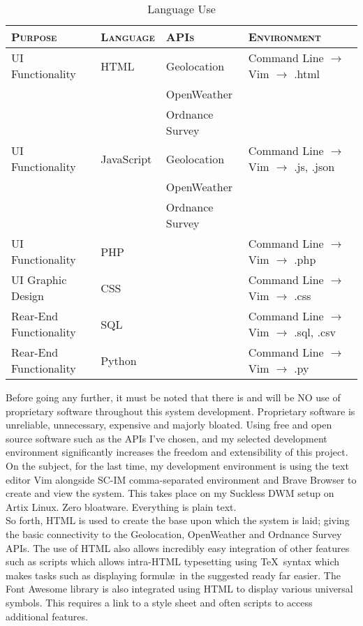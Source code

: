 \documentclass[11pt, english]{article}
\begin{document}
	\begin{table}[h]
		\scriptsize
		\renewcommand{\arraystretch}{1.25}
	\begin{center}
	\begin{tabular}{llll}
		\textsc{Purpose} & \textsc{Language} & \textsc{APIs} & \textsc{Environment}\\
		\hline
		UI Functionality & HTML & Geolocation & Command Line $\rightarrow$ Vim $\rightarrow$ .html\\
		& & OpenWeather\\
		& & Ordnance Survey\\
		UI Functionality & JavaScript & Geolocation & Command Line $\rightarrow$ Vim $\rightarrow$ .js, .json\\
		& & OpenWeather\\
		& & Ordnance Survey\\
		UI Functionality & PHP & & Command Line $\rightarrow$ Vim $\rightarrow$ .php\\
		UI Graphic Design & CSS & & Command Line $\rightarrow$ Vim $\rightarrow$ .css\\
		Rear-End Functionality & SQL & & Command Line $\rightarrow$ Vim $\rightarrow$ .sql, .csv\\
		Rear-End Functionality & Python & & Command Line $\rightarrow$ Vim $\rightarrow$ .py\\
		\hline
	\end{tabular}
		\caption{Language Use}
	\end{center}
	\end{table}

	Before going any further, it must be noted that there is and will be NO use of proprietary software throughout this system development. Proprietary software is unreliable, unnecessary, expensive and majorly bloated. Using free and open source software such as the APIs I've chosen, and my selected development environment significantly increases the freedom and extensibility of this project. On the subject, for the last time, my development environment is using the text editor Vim alongside SC-IM comma-separated environment and Brave Browser to create and view the system. This takes place on my Suckless DWM setup on Artix Linux. Zero bloatware. Everything is plain text.\\

	So forth, HTML is used to create the base upon which the system is laid; giving the basic connectivity to the Geolocation, OpenWeather and Ordnance Survey APIs. The use of HTML also allows incredibly easy integration of other features such as scripts which allows intra-HTML typesetting using \TeX\ syntax which makes tasks such as displaying formul\ae\ in the suggested ready far easier. The Font Awesome library is also integrated using HTML to display various universal symbols. This requires a link to a style sheet and often scripts to access additional features.\\
\end{document}
